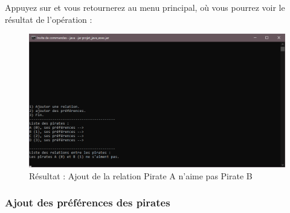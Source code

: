 \documentclass[12pt]{article}
\begin{document}
Appuyez sur  et vous retournerez au menu principal, où vous pourrez voir le résultat de l'opération :
\begin{figure}[H]
\includegraphics[width=16cm]{ajout_relation_3}
\centering
\caption{Résultat : Ajout de la relation Pirate A n'aime pas Pirate B}
\end{figure}


\subsubsection{Ajout des préférences des pirates}
\end{document}
